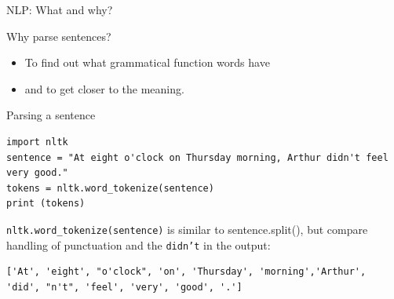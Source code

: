 \documentclass{beamer}
\begin{document}
{
\begin{frame}[plain]
\end{frame}
}



\begin{frame}{NLP: What and why?}
\begin{block}{Why parse sentences?}
\begin{itemize}
\item To find out what grammatical function words have
\item and to get closer to the meaning.
\end{itemize}
\end{block}
\end{frame}

\begin{frame}[fragile]{Parsing a sentence}
\begin{lstlisting}
import nltk
sentence = "At eight o'clock on Thursday morning, Arthur didn't feel very good."
tokens = nltk.word_tokenize(sentence)
print (tokens)
\end{lstlisting}

\texttt{nltk.word\_tokenize(sentence)} is similar to sentence.split(), but compare handling of punctuation and the \texttt{didn't} in the output:
\begin{lstlisting}
['At', 'eight', "o'clock", 'on', 'Thursday', 'morning','Arthur', 'did', "n't", 'feel', 'very', 'good', '.']
\end{lstlisting}
\end{frame}
\end{document}
